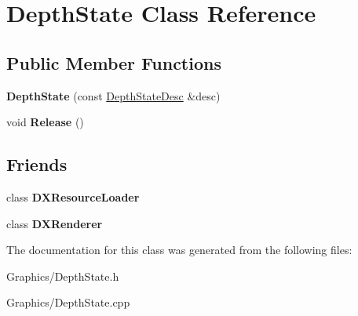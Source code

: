 \hypertarget{classDepthState}{}\section{Depth\+State Class Reference}
\label{classDepthState}
\subsection*{Public Member Functions}
\begin{DoxyCompactItemize}
\item 
\mbox{\label{classDepthState_a2a0891d860451635451e8a7fff11464b}} 
{\bfseries Depth\+State} (const \hyperlink{structDepthStateDesc}{Depth\+State\+Desc} \&desc)
\item 
\mbox{\label{classDepthState_a175a7df535433397ddbef59d9b68cf4d}} 
void {\bfseries Release} ()
\end{DoxyCompactItemize}
\subsection*{Friends}
\begin{DoxyCompactItemize}
\item 
\mbox{\label{classDepthState_a871268c492209c5a9db9dc2db99f4d04}} 
class {\bfseries D\+X\+Resource\+Loader}
\item 
\mbox{\label{classDepthState_a14ab6f966322dccbf6597d0c82bf48c6}} 
class {\bfseries D\+X\+Renderer}
\end{DoxyCompactItemize}


The documentation for this class was generated from the following files\+:\begin{DoxyCompactItemize}
\item 
Graphics/Depth\+State.\+h\item 
Graphics/Depth\+State.\+cpp\end{DoxyCompactItemize}
